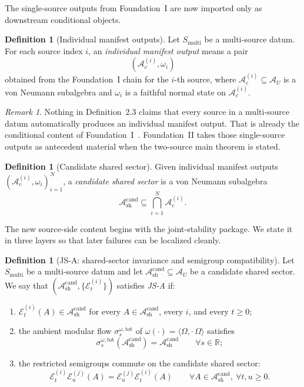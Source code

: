\documentclass[12pt]{article}
\theoremstyle{definition}
\newtheorem{definition}[theorem]{Definition}
\theoremstyle{remark}
\newtheorem{remark}[theorem]{Remark}
\begin{document}
The single-source outputs from Foundation~I are now imported only as
downstream conditional objects.

\begin{definition}[Individual manifest outputs]
Let \(S_{\mathrm{multi}}\) be a multi-source datum. For each source
index \(i\), an \emph{individual manifest output} means a pair
\[
(\mathcal A_c^{(i)},\omega_i)
\]
obtained from the Foundation~I chain for the \(i\)-th source, where
\(\mathcal A_c^{(i)}\subseteq \mathcal A_U\) is a von Neumann
subalgebra and \(\omega_i\) is a faithful normal state on
\(\mathcal A_c^{(i)}\).
\end{definition}

\begin{remark}
Nothing in Definition~2.3 claims that every source in a multi-source
datum automatically produces an individual manifest output. That is
already the conditional content of Foundation~I~\cite{FoundationI}.
Foundation~II takes those single-source outputs as antecedent material
when the two-source main theorem is stated.
\end{remark}

\begin{definition}[Candidate shared sector]
Given individual manifest outputs
\((\mathcal A_c^{(i)},\omega_i)_{i=1}^N\), a
\emph{candidate shared sector} is a von Neumann subalgebra
\[
\mathcal A_{\mathrm{sh}}^{\mathrm{cand}}
\subseteq
\bigcap_{i=1}^N \mathcal A_c^{(i)}.
\]
\end{definition}

The new source-side content begins with the joint-stability package. We
state it in three layers so that later failures can be localized
cleanly.

\begin{definition}[JS-A: shared-sector invariance and semigroup compatibility]
\label{def:JSA}
Let \(S_{\mathrm{multi}}\) be a multi-source datum and let
\(\mathcal A_{\mathrm{sh}}^{\mathrm{cand}}\subseteq\mathcal A_U\) be a
candidate shared sector. We say that
\((\mathcal A_{\mathrm{sh}}^{\mathrm{cand}},\{\mathcal E_t^{(i)}\})\)
satisfies \emph{JS-A} if:
\begin{enumerate}
\item \(\mathcal E_t^{(i)}(A)\in \mathcal A_{\mathrm{sh}}^{\mathrm{cand}}\)
  for every \(A\in\mathcal A_{\mathrm{sh}}^{\mathrm{cand}}\), every
  \(i\), and every \(t\ge 0\);
\item the ambient modular flow
  \(\sigma_s^{\omega,\mathrm{tot}}\) of
  \(\omega(\cdot)=\langle\Omega,\cdot\,\Omega\rangle\) satisfies
  \[
  \sigma_s^{\omega,\mathrm{tot}}
  (\mathcal A_{\mathrm{sh}}^{\mathrm{cand}})
  =
  \mathcal A_{\mathrm{sh}}^{\mathrm{cand}}
  \qquad
  \forall s\in\mathbb R;
  \]
\item the restricted semigroups commute on the candidate shared sector:
  \[
  \mathcal E_t^{(i)}\mathcal E_u^{(j)}(A)
  =
  \mathcal E_u^{(j)}\mathcal E_t^{(i)}(A)
  \qquad
  \forall A\in \mathcal A_{\mathrm{sh}}^{\mathrm{cand}},
  \ \forall t,u\ge 0.
  \]
\end{enumerate}
\end{definition}
\end{document}
